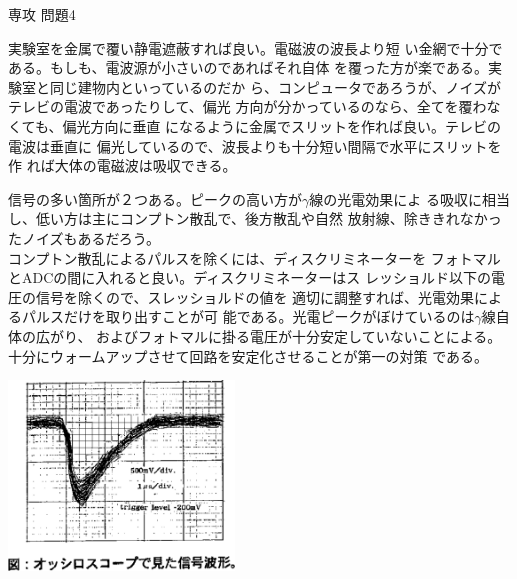 \documentclass[fleqn]{jbook}
\begin{document}
\begin{answer}{専攻 問題4}{}
\begin{subanswers}
\SubAnswer
 実験室を金属で覆い静電遮蔽すれば良い。電磁波の波長より短
 い金網で十分である。もしも、電波源が小さいのであればそれ自体
 を覆った方が楽である。実験室と同じ建物内といっているのだか
 ら、コンピュータであろうが、ノイズがテレビの電波であったりして、偏光
 方向が分かっているのなら、全てを覆わなくても、偏光方向に垂直
 になるように金属でスリットを作れば良い。テレビの電波は垂直に
 偏光しているので、波長よりも十分短い間隔で水平にスリットを作
 れば大体の電磁波は吸収できる。

\SubAnswer
 \parbox[t]{90mm}{
 信号の多い箇所が２つある。ピークの高い方が$\gamma$線の光電効果によ
 る吸収に相当し、低い方は主にコンプトン散乱で、後方散乱や自然
 放射線、除ききれなかったノイズもあるだろう。\\
 コンプトン散乱によるパルスを除くには、ディスクリミネーターを
 フォトマルとADCの間に入れると良い。ディスクリミネーターはス
 レッショルド以下の電圧の信号を除くので、スレッショルドの値を
 適切に調整すれば、光電効果によるパルスだけを取り出すことが可
 能である。光電ピークがぼけているのは$\gamma$線自体の広がり、
 およびフォトマルに掛る電圧が十分安定していないことによる。
 十分にウォームアップさせて回路を安定化させることが第一の対策
 である。
}
\parbox[t]{60mm}{
\begin{center}
\includegraphics[width=60mm]{1998physQ4_2r.eps} %
\end{center}
}

\end{subanswers}
\end{answer}
\end{document}
